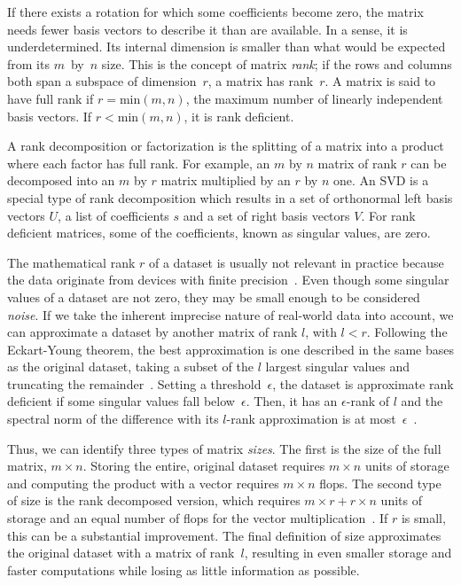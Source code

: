 \documentclass[ijgi,article,submit,moreauthors,pdftex,10pt,a4paper]{Definitions/mdpi}
\begin{document}
If there exists a rotation for which some coefficients become zero, the matrix needs fewer basis vectors to describe it than are available. In a sense, it is underdetermined. Its internal dimension is smaller than what would be expected from its $m$~by~$n$ size. This is the concept of matrix \textit{rank}; if the rows and columns both span a subspace of dimension~$r$, a matrix has rank~$r$. A matrix is said to have full rank if $r = \text{min}(m, n)$, the maximum number of linearly independent basis vectors. If $r < \text{min}(m, n)$, it is rank deficient.

A rank decomposition or factorization is the splitting of a matrix into a product where each factor has full rank. For example, an $m$ by $n$ matrix of rank $r$ can be decomposed into an $m$ by $r$ matrix multiplied by an $r$ by $n$ one. %
An SVD is a special type of rank decomposition which results in a set of orthonormal left basis vectors $U$, a list of coefficients $s$ and a set of right basis vectors $V$. For rank deficient matrices, some of the coefficients, known as singular values, are zero.

The mathematical rank $r$ of a dataset is usually not relevant in practice because the data originate from devices with finite precision~\cite{Martinsson2016}. Even though some singular values of a dataset are not zero, they may be small enough to be considered \textit{noise}. If we take the inherent imprecise nature of real-world data into account, we can approximate a dataset by another matrix of rank $l$, with $l < r$. Following the Eckart-Young theorem, the best approximation is one described in the same bases as the original dataset, taking a subset of the $l$ largest singular values and truncating the remainder~\cite{Eckart1936}. Setting a threshold~$\epsilon$, the dataset is approximate rank deficient if some singular values fall below~$\epsilon$. Then, it has an $\epsilon$-rank of $l$ and the spectral norm of the difference with its $l$-rank approximation is at most~$\epsilon$~\cite{Martinsson2016}.

Thus, we can identify three types of matrix \textit{sizes}. The first is the size of the full matrix, $m \times n$. Storing the entire, original dataset requires $m \times n$ units of storage and computing the product with a vector requires $m \times n$ flops. The second type of size is the rank decomposed version, which requires $m \times r + r \times n$ units of storage and an equal number of flops for the vector multiplication~\cite{Martinsson2016}. If $r$ is small, this can be a substantial improvement. The final definition of size approximates the original dataset with a matrix of rank~$l$, resulting in even smaller storage and faster computations while losing as little information as possible.
\end{document}
